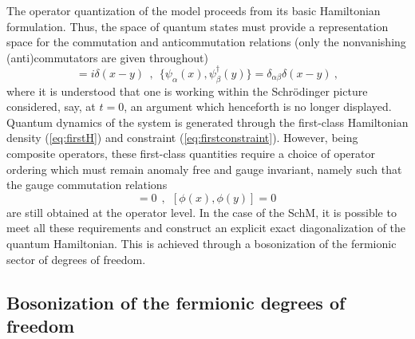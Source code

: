 \documentclass[a4paper,11pt]{article}
\begin{document}
The operator quantization of the model proceeds from its basic Hamiltonian
formulation. Thus, the space of quantum states must provide a representation
space for the commutation and anticommutation relations (only the
nonvanishing (anti)commutators are given throughout)
\begin{equation}
[A^1(x),\pi_1(y)]=i\delta(x-y)\ \ ,\ \ 
\{\psi_\alpha(x),\psi^\dagger_\beta(y)\}=\delta_{\alpha\beta}\delta(x-y)\ ,
\label{eq:commutations}
\end{equation}
where it is understood that one is working within the Schr\"odinger picture
considered, say, at $t=0$, an argument which henceforth is no longer displayed.
Quantum dynamics of the system is generated through the first-class
Hamiltonian density (\ref{eq:firstH}) and constraint
(\ref{eq:firstconstraint}). However, being composite ope\-ra\-tors, these
first-class quantities require a choice of operator ordering which must
remain anomaly free and gauge invariant, namely such that the gauge 
commutation relations
\begin{equation}
[\phi(x),{\cal H}(y)]=0\ \ ,\ \ 
[\phi(x),\phi(y)]=0\ 
\end{equation}
are still obtained at the operator level. In the case of the SchM, it is
possible to meet all these requirements and construct an explicit
exact diagonalization of the quantum Hamiltonian. This is achieved
through a bosonization of the fermionic sector of degrees of 
freedom.\cite{Manton,Hetrick}

\subsection{Bosonization of the fermionic degrees of freedom}
\end{document}
